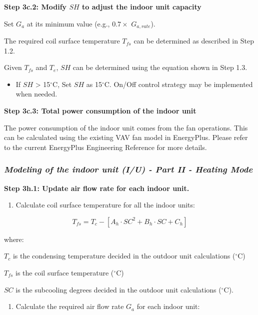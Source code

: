 \textbf{Step 3c.2: Modify \(SH\) to adjust the indoor unit capacity}

Set \(G_a\) at its minimum value (e.g., \(0.7\times\) \(G_{a,rate}\)).

The required coil surface temperature \(T_{fs}\) can be determined as described in Step 1.2.

Given \(T_{fs}\) and \(T_e\), \(SH\) can be determined using the equation shown in Step 1.3.

\begin{itemize}
\tightlist
\item
  If \(SH\) \textgreater{} 15\(^{\circ}\)C, Set \(SH\) as 15\(^{\circ}\)C. On/Off control strategy may be implemented when needed.
\end{itemize}

\textbf{Step 3c.3: Total power consumption of the indoor unit}

The power consumption of the indoor unit comes from the fan operations. This can be calculated using the existing VAV fan model in EnergyPlus. Please refer to the current EnergyPlus Engineering Reference for more details.

\subsubsection{\emph{Modeling of the indoor unit (I/U) - Part II - Heating Mode}}\label{modeling-of-the-indoor-unit-iu---part-ii---heating-mode}

\textbf{Step 3h.1: Update air flow rate for each indoor unit.}

\begin{enumerate}
\def\labelenumi{\arabic{enumi})}
\tightlist
\item
  Calculate coil surface temperature for all the indoor units:
\end{enumerate}

\begin{equation}
T_{fs} = T_c-[A_h\cdot SC^2+B_h\cdot SC+C_h]
\end{equation}

where:

\(T_c\) is the condensing temperature decided in the outdoor unit calculations (\(^{\circ}\)C)

\(T_{fs}\) is the coil surface temperature (\(^{\circ}\)C)

\(SC\) is the subcooling degrees decided in the outdoor unit calculations (\(^{\circ}\)C).

\begin{enumerate}
\def\labelenumi{\arabic{enumi})}
\setcounter{enumi}{1}
\tightlist
\item
  Calculate the required air flow rate \(G_a\) for each indoor unit:
\end{enumerate}

